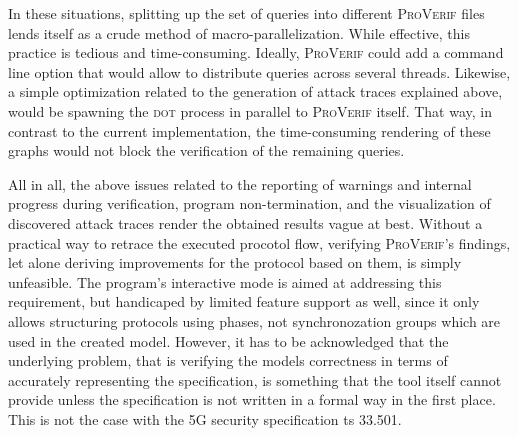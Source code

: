 In these situations, splitting up the set of queries into different \textsc{ProVerif} files lends itself as a crude method of macro-parallelization.
While effective, this practice is tedious and time-consuming.
Ideally, \textsc{ProVerif} could add a command line option that would allow to distribute queries across several threads.
Likewise, a simple optimization related to the generation of attack traces explained above, would be spawning the \textsc{dot} process in parallel to \textsc{ProVerif} itself.
That way, in contrast to the current implementation, the time-consuming rendering of these graphs would not block the verification of the remaining queries.\medskip

All in all, the above issues related to the reporting of warnings and internal progress during verification, program non-termination, and the visualization of discovered attack traces render the obtained results vague at best.
Without a practical way to retrace the executed procotol flow, verifying \textsc{ProVerif}'s findings, let alone deriving improvements for the protocol based on them, is simply unfeasible.
The program's interactive mode is aimed at addressing this requirement, but handicaped by limited feature support as well, since it only allows structuring protocols using phases, not synchronozation groups which are used in the created model.
However, it has to be acknowledged that the underlying problem, that is verifying the models correctness in terms of accurately representing the specification, is something that the tool itself cannot provide unless the specification is not written in a formal way in the first place.
This is not the case with the 5G security specification \gls{ts} 33.501.